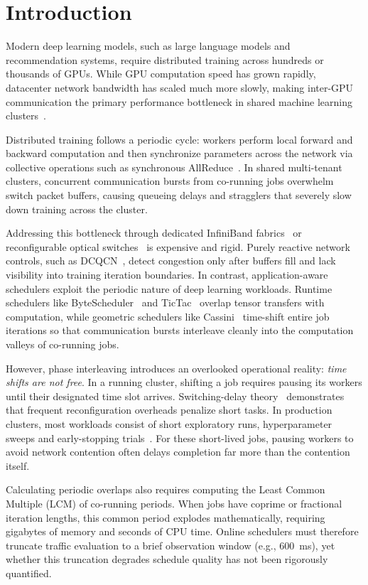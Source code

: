\documentclass[conference]{IEEEtran}
\begin{document}
\section{Introduction}
\label{sec:introduction}

Modern deep learning models, such as large language models and recommendation systems, require distributed training across hundreds or thousands of GPUs. While GPU computation speed has grown rapidly, datacenter network bandwidth has scaled much more slowly, making inter-GPU communication the primary performance bottleneck in shared machine learning clusters~\cite{bytescheduler,tictac,shockwave}.

Distributed training follows a periodic cycle: workers perform local forward and backward computation and then synchronize parameters across the network via collective operations such as synchronous AllReduce~\cite{allreduce_ring}. In shared multi-tenant clusters, concurrent communication bursts from co-running jobs overwhelm switch packet buffers, causing queueing delays and stragglers that severely slow down training across the cluster.

Addressing this bottleneck through dedicated InfiniBand fabrics~\cite{infiniband} or reconfigurable optical switches~\cite{tpuv4} is expensive and rigid. Purely reactive network controls, such as DCQCN~\cite{dcqcn}, detect congestion only after buffers fill and lack visibility into training iteration boundaries. In contrast, application-aware schedulers exploit the periodic nature of deep learning workloads. Runtime schedulers like ByteScheduler~\cite{bytescheduler} and TicTac~\cite{tictac} overlap tensor transfers with computation, while geometric schedulers like Cassini~\cite{cassini} time-shift entire job iterations so that communication bursts interleave cleanly into the computation valleys of co-running jobs.

However, phase interleaving introduces an overlooked operational reality: \emph{time shifts are not free}. In a running cluster, shifting a job requires pausing its workers until their designated time slot arrives. Switching-delay theory~\cite{eclipse,khanna2017} demonstrates that frequent reconfiguration overheads penalize short tasks. In production clusters, most workloads consist of short exploratory runs, hyperparameter sweeps and early-stopping trials~\cite{philly_osdi}. For these short-lived jobs, pausing workers to avoid network contention often delays completion far more than the contention itself.

Calculating periodic overlaps also requires computing the Least Common Multiple (LCM) of co-running periods. When jobs have coprime or fractional iteration lengths, this common period explodes mathematically, requiring gigabytes of memory and seconds of CPU time. Online schedulers must therefore truncate traffic evaluation to a brief observation window (e.g., 600~ms), yet whether this truncation degrades schedule quality has not been rigorously quantified.
\end{document}
